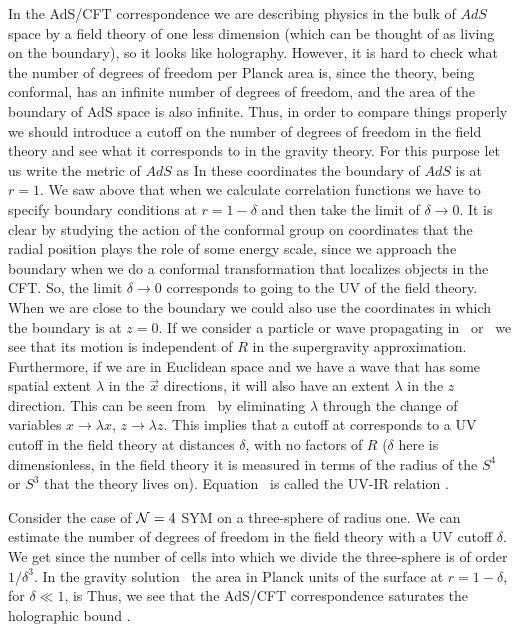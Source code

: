 In the AdS/CFT correspondence we are describing physics in the bulk of
$AdS$ space by a field theory of one less dimension (which can be thought
of as living
on the boundary), so it looks like holography. However, it is hard
to check what the number of degrees of freedom per Planck area is, since
the   theory, being 
conformal,  has an infinite number of degrees of freedom, and the 
area of the boundary of AdS space is also infinite. 
Thus, in order to compare things properly we should introduce a cutoff on
the number of degrees of freedom in the field theory and see what
it corresponds to  in the gravity theory. 
For this  purpose let us write the metric of $AdS$ as 
In these coordinates the boundary of $AdS$ is at $r= 1$.
We saw above that when we calculate correlation functions 
we have to specify boundary conditions at $r = 1-\delta $ and then
take the limit of $\delta \to 0$. 
It is clear by studying the action of the conformal group on 
\Poincare coordinates that the radial position plays the role of
some energy scale, since we approach the boundary when we do a 
conformal transformation that localizes objects in the CFT. 
So, the limit $\delta \to 0$ corresponds to going to the UV of the
field theory.
When we are close to the boundary we could also use the \Poincare 
coordinates
in which the boundary is at $z=0$.
 If we consider a particle or wave propagating in 
\poinc\ or \adscav\
 we see that its motion is independent of $R$ in the supergravity
approximation. Furthermore,  if we are in Euclidean space  and
we have a wave that has some spatial extent 
$\lambda$ in the $\vec x$ directions, it will also have an 
extent $\lambda$ in the $z$ direction. This can be seen from \poinc\
by eliminating $\lambda $ through the change of variables 
$ x \to \lambda x $, $ z \to \lambda z$. 
This implies that a cutoff at 
corresponds to 
a UV cutoff in the field theory at distances $\delta$, with 
no factors of $R$ ($\delta$ here is dimensionless, in the field theory
it is measured in terms of the radius of the $S^4$ or $S^3$ that the
theory lives on). Equation \iruv\ is called the UV-IR 
relation \cite{Susskind:1998dq}.

 Consider the case of ${\cal N} = 4 $ 
SYM on a three-sphere of radius one.
 We can estimate the number of degrees of freedom in the field theory
with a UV cutoff $\delta$. We get
since the number of cells into which we divide the three-sphere is of
order $1/\delta^3$.
In the gravity solution  \adscav\ 
the area in Planck units of 
the surface at $r = 1 - \delta $, for $\delta \ll 1$, is 
\eqn{areagrav}{
{ { \rm Area} \over 4 G_N} = { V_{S^5} R^3 \delta^{-3} \over 4 G_N} 
\sim N^2 \delta^{-3}.
}
Thus, we see that the AdS/CFT correspondence saturates the holographic bound
\cite{Susskind:1998dq}. 


